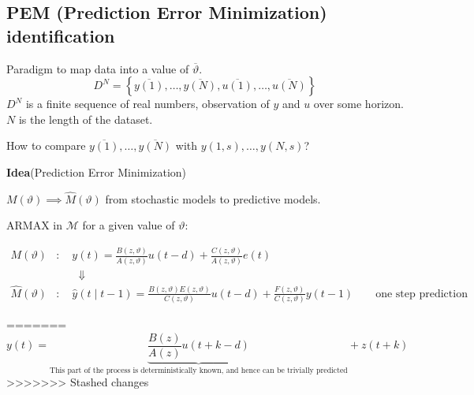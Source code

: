 \subsection{PEM (Prediction Error Minimization) identification}

Paradigm to map data into a value of $\overline{\vartheta}$.
$$
	D^N=\left\{\overline{y(1)},\ldots,\overline{y(N)},\overline{u(1)},\ldots,\overline{u(N)}\right\}
$$
$D^N$ is a finite sequence of real numbers, observation of $y$ and $u$ over some horizon. $N$ is the length of the dataset.


How to compare $\overline{y(1)},\ldots,\overline{y(N)}$ with $y(1,s),\ldots,y(N,s)$?


\textbf{Idea}(Prediction Error Minimization)

$M(\vartheta)\implies \hat{M}(\vartheta)$ from stochastic models to predictive models.

ARMAX in $\mathcal{M}$ for a given value of $\vartheta$:

\begin{align*}
	M(\vartheta)&:\quad y(t)=\frac{B(z, \vartheta)}{A(z, \vartheta)} u(t-d)+\frac{C(z, \vartheta)}{A(z, \vartheta)} e(t)\\
	&\qquad\Downarrow\\
	\hat{M}(\vartheta)&: \quad \hat{y}(t \mid t-1) =\frac{B(z,\vartheta) E(z,\vartheta)}{C(z,\vartheta)} u(t-d)+\frac{F(z,\vartheta)}{C(z,\vartheta)} y(t-1) \qquad \text{one step prediction}
\end{align*}



=======
$$y(t)=\underbrace{\frac{B(z)}{A(z)} u(t+k-d)}_{\text{This part of the process 
		is deterministically 
		known, and hence can 
		be trivially predicted}} +z(t+k)$$
>>>>>>> Stashed changes
